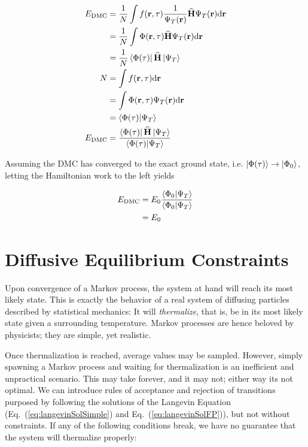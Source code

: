 \begin{align*}
 E_\mathrm{DMC} &= \frac{1}{N}\int f(\mathbf{r}, \tau) \frac{1}{\Psi_T(\mathbf{r})} {\bf\widehat{H}} \Psi_T(\mathbf{r}) \mathrm{d}\mathbf{r} \\
                &= \frac{1}{N}\int \Phi(\mathbf{r}, \tau) {\bf\widehat{H}} \Psi_T(\mathbf{r}) \mathrm{d}\mathbf{r} \\
                &= \frac{1}{N}\left< \Phi(\tau) \right|{\bf\widehat{H}}\left| \Psi_T \right> \\
               N&= \int f(\mathbf{r}, \tau) \mathrm{d}\mathbf{r} \\
                &= \int \Phi(\mathbf{r}, \tau)\Psi_T(\mathbf{r})\mathrm{d}\mathbf{r} \\
                &= \left\langle \Phi(\tau) | \Psi_T\right\rangle\\
 E_\mathrm{DMC} &= \frac{\left< \Phi(\tau) \right|{\bf\widehat{H}}\left| \Psi_T \right>}{\left\langle \Phi(\tau) | \Psi_T\right\rangle}\\
\end{align*}

Assuming the DMC has converged to the exact ground state, i.e. $\left| \Phi(\tau) \right>\to\left| \Phi_0 \right>$, letting the Hamiltonian work to the left yields

\begin{align*}
 E_\mathrm{DMC} &= E_0\frac{\left\langle \Phi_0 | \Psi_T\right\rangle}{\left\langle \Phi_0 | \Psi_T\right\rangle} \\
                &= E_0
\end{align*}

\section{Diffusive Equilibrium Constraints}

Upon convergence of a Markov process, the system at hand will reach its most likely state. This is exactly the behavior of a real system of diffusing particles described by statistical mechanics: It will \textit{thermalize}, that is, be in its most likely state given a surrounding temperature. Markov processes are hence beloved by physicists; they are simple, yet realistic. 

Once thermalization is reached, average values may be sampled. However, simply spawning a Markov process and waiting for thermalization is an inefficient and unpractical scenario. This may take forever, and it may not; either way its not optimal. We can introduce rules of acceptance and rejection of transitions purposed by following the solutions of the Langevin Equation (Eq.~(\ref{eq:langevinSolSimple}) and Eq.~(\ref{eq:langevinSolFP})), but not without constraints. If any of the following conditions break, we have no guarantee that the system will thermalize properly:

